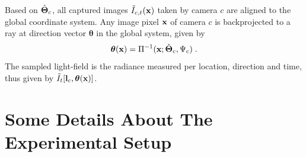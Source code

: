 \documentclass[runningheads]{llncs}
\begin{document}
Based on $\hat{\bf \Theta}_c$, all captured images $\tilde I_{c,t}(\bf x)$ taken by camera $c$ are aligned to the global coordinate system. Any image pixel ${\bf x}$ of camera $c$ is backprojected to a ray at direction vector ${\bm \theta}$ in the global system, given by
\begin{equation}
 {\bm \theta}({\bf x})={\Pi}^{-1}({\bf x};\hat{\bf{\Theta}}_c,\Psi_c)
  \;.
 \label{eq:thetac}
\end{equation}
The sampled light-field is the radiance measured per location, direction and time, thus given by
$\tilde I_t[{\bf l}_c,{\bm \theta}(\bf x)]$.

\section{Some Details About The Experimental Setup}
\label{sec:set}
\end{document}
